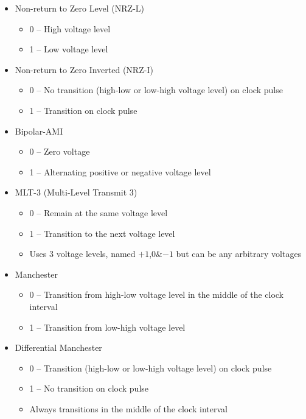 \begin{itemize}
  \item Non-return to Zero Level (NRZ-L)
  \begin{itemize}
    \item 0 -- High voltage level
    \item 1 -- Low voltage level
  \end{itemize}
  \item Non-return to Zero Inverted (NRZ-I)
  \begin{itemize}
    \item 0 -- No transition (high-low or low-high voltage level) on clock pulse
    \item 1 -- Transition on clock pulse
  \end{itemize}
  \item Bipolar-AMI
  \begin{itemize}
    \item 0 -- Zero voltage
    \item 1 -- Alternating positive or negative voltage level 
  \end{itemize}
  \item MLT-3 (Multi-Level Transmit 3)
  \begin{itemize}
    \item 0 -- Remain at the same voltage level
    \item 1 -- Transition to the next voltage level
    \item Uses 3 voltage levels, named $+1$,$0$\&$-1$ but can be any arbitrary voltages
  \end{itemize}
  \item Manchester
  \begin{itemize}
    \item 0 -- Transition from high-low voltage level in the middle of the clock interval
    \item 1 -- Transition from low-high voltage level
  \end{itemize}
  \item Differential Manchester
  \begin{itemize}
    \item 0 -- Transition (high-low or low-high voltage level) on clock pulse
    \item 1 -- No transition on clock pulse
    \item Always transitions in the middle of the clock interval  
  \end{itemize}
\end{itemize}

